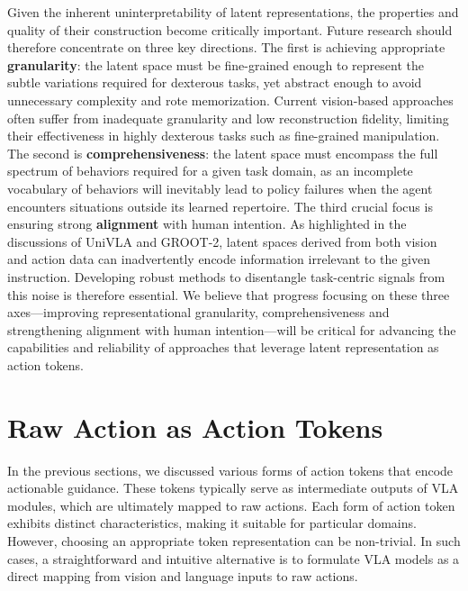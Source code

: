 \documentclass[10pt, a4paper, logo, copyright]{googledeepmind} %
\begin{document}
Given the inherent uninterpretability of latent representations, the properties and quality of their construction become critically important.
Future research should therefore concentrate on three key directions. The first is achieving appropriate \textbf{granularity}: the latent space must be fine-grained enough to represent the subtle variations required for dexterous tasks, yet abstract enough to avoid unnecessary complexity and rote memorization. Current vision-based approaches often suffer from inadequate granularity and low reconstruction fidelity, limiting their effectiveness in highly dexterous tasks such as fine-grained manipulation.
The second is \textbf{comprehensiveness}: the latent space must encompass the full spectrum of behaviors required for a given task domain, as an incomplete vocabulary of behaviors will inevitably lead to policy failures when the agent encounters situations outside its learned repertoire.
The third crucial focus is ensuring strong \textbf{alignment} with human intention. As highlighted in the discussions of UniVLA and GROOT-2, latent spaces derived from both vision and action data can inadvertently encode information irrelevant to the given instruction. Developing robust methods to disentangle task-centric signals from this noise is therefore essential. We believe that progress focusing on these three axes---improving representational granularity, comprehensiveness and strengthening alignment with human intention---will be critical for advancing the capabilities and reliability of approaches that leverage latent representation as action tokens.




% 
\section{Raw Action as Action Tokens}
\label{sec:raw-action}

In the previous sections, we discussed various forms of action tokens that encode actionable guidance. These tokens typically serve as intermediate outputs of VLA modules, which are ultimately mapped to raw actions. Each form of action token exhibits distinct characteristics, making it suitable for particular domains. However, choosing an appropriate token representation can be non-trivial. In such cases, a straightforward and intuitive alternative is to formulate VLA models as a direct mapping from vision and language inputs to raw actions.
\end{document}
